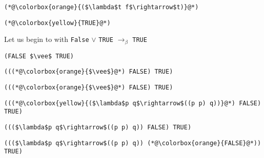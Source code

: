 \documentclass{beamer}
\begin{document}
\begin{frame}[fragile]{\CurrentSection}
\lstset{basicstyle=\ttfamily\small}\lstset{numbers=none}\lstset{language=ML}\begin{lstlisting}
(*@\colorbox{orange}{($\lambda$t f$\rightarrow$t)}@*)
\end{lstlisting}
\pause\lstset{language=ML}\begin{lstlisting}
(*@\colorbox{yellow}{TRUE}@*)
\end{lstlisting}

\end{frame}

\begin{frame}[fragile]{\CurrentSection}
\begin{block}{\CurrentSubSection}
Let us begin to with \texttt{False} $\vee$ \texttt{TRUE} $\rightarrow_\beta$ \texttt{TRUE}
\end{block}


\end{frame}

\begin{frame}[fragile]{\CurrentSection}
\lstset{basicstyle=\ttfamily\small}\lstset{numbers=none}\lstset{language=ML}\begin{lstlisting}
(FALSE $\vee$ TRUE)
\end{lstlisting}
\pause\lstset{language=ML}\begin{lstlisting}
(((*@\colorbox{orange}{$\vee$}@*) FALSE) TRUE)
\end{lstlisting}

\end{frame}

\begin{frame}[fragile]{\CurrentSection}
\lstset{basicstyle=\ttfamily\small}\lstset{numbers=none}\lstset{language=ML}\begin{lstlisting}
(((*@\colorbox{orange}{$\vee$}@*) FALSE) TRUE)
\end{lstlisting}
\pause\lstset{language=ML}\begin{lstlisting}
(((*@\colorbox{yellow}{($\lambda$p q$\rightarrow$((p p) q))}@*) FALSE) TRUE)
\end{lstlisting}

\end{frame}

\begin{frame}[fragile]{\CurrentSection}
\lstset{basicstyle=\ttfamily\small}\lstset{numbers=none}\lstset{language=ML}\begin{lstlisting}
((($\lambda$p q$\rightarrow$((p p) q)) FALSE) TRUE)
\end{lstlisting}
\pause\lstset{language=ML}\begin{lstlisting}
((($\lambda$p q$\rightarrow$((p p) q)) (*@\colorbox{orange}{FALSE}@*)) TRUE)
\end{lstlisting}

\end{frame}
\end{document}

